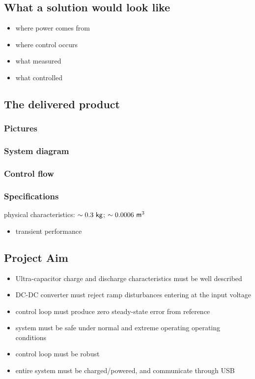 \subsection{What a solution would look like}
\begin{itemize}
    \item where power comes from
    \item where control occurs
    \item what measured
    \item what controlled
\end{itemize}
\subsection{The delivered product}
\subsubsection{Pictures}
\subsubsection{System diagram}
\subsubsection{Control flow}
\subsubsection{Specifications}
physical characteristics: $\sim 0.3 \ \mathsf{kg}$; $\sim 0.0006 \ \mathsf{m}^3$
\begin{itemize}
    \item transient performance
\end{itemize}
\subsection{Project Aim}
\begin{itemize}
    \item Ultra-capacitor charge and discharge characteristics must be well described
    \item DC-DC converter must reject ramp disturbances entering at the input voltage
    \item control loop must produce zero steady-state error from reference
    \item system must be safe under normal and extreme operating operating conditions
    \item control loop must be robust
    \item entire system must be charged/powered, and communicate through USB
\end{itemize}
